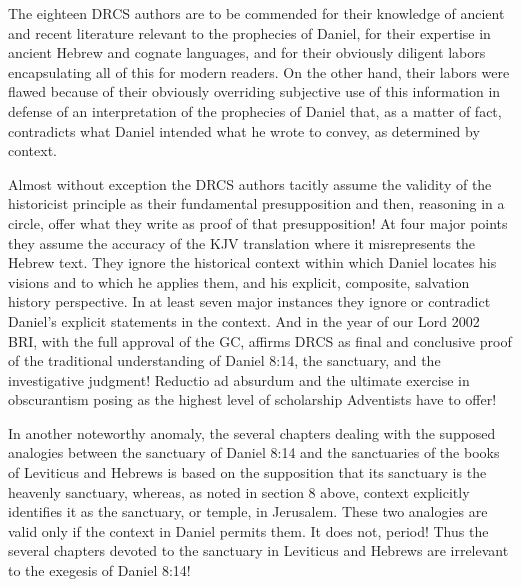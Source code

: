 The eighteen DRCS authors are to be commended for their knowledge of ancient
and recent literature relevant to the prophecies of Daniel, for their
expertise in ancient Hebrew and cognate languages, and for their obviously
diligent labors encapsulating all of this for modern readers. On the other
hand, their labors were flawed because of their obviously overriding
subjective use of this information in defense of an interpretation of the
prophecies of Daniel that, as a matter of fact, contradicts what Daniel
intended what he wrote to convey, as determined by context.

Almost without exception the DRCS authors tacitly assume the validity of the
historicist principle as their fundamental presupposition and then,
reasoning in a circle, offer what they write as proof of that
presupposition! At four major points they assume the accuracy of the KJV
translation where it misrepresents the Hebrew text. They ignore the
historical context within which Daniel locates his visions and to which he
applies them, and his explicit, composite, salvation history perspective. In
at least seven major instances they ignore or contradict Daniel's explicit
statements in the context. And in the year of our Lord 2002 BRI, with the
full approval of the GC, affirms DRCS as final and conclusive proof of the
traditional understanding of Daniel 8:14, the sanctuary, and the 
investigative judgment! Reductio ad absurdum and the ultimate exercise in
obscurantism posing as the highest level of scholarship Adventists have to
offer!

In another noteworthy anomaly, the several chapters dealing with the
supposed analogies between the sanctuary of Daniel 8:14 and the sanctuaries
of the books of Leviticus and Hebrews is based on the supposition that its
sanctuary is the heavenly sanctuary, whereas, as noted in section 8 above,
context explicitly identifies it as the sanctuary, or temple, in Jerusalem.
These two analogies are valid only if the context in Daniel permits them. It
does not, period! Thus the several chapters devoted to the sanctuary in
Leviticus and Hebrews are irrelevant to the exegesis of Daniel 8:14! 

